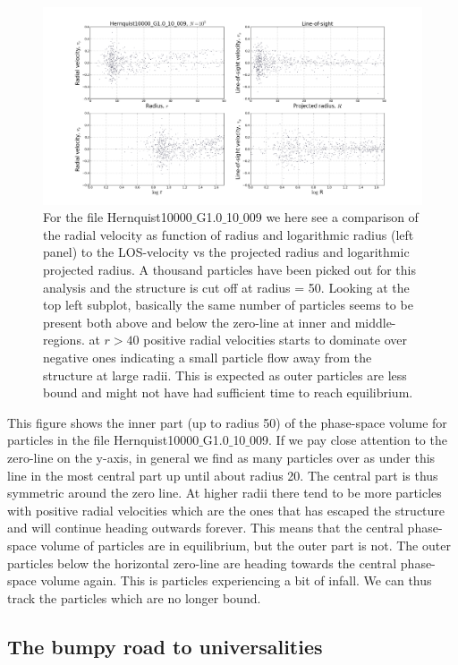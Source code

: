 \begin{figure}
\centering
\includegraphics[width=1.0\linewidth]{img/LOS_radius50_N1000.png}
\caption{For the file Hernquist10000$\_$G1.0$\_$10$\_$009 we here see a comparison of the radial velocity as function of radius and logarithmic radius (left panel) to the LOS-velocity vs the projected radius and logarithmic projected radius. A thousand particles have been picked out for this analysis and the structure is cut off at radius = 50.
Looking at the top left subplot, basically the same number of particles seems to be present both above and below the zero-line at inner and middle-regions. at $r>40$ positive radial velocities starts to dominate over negative ones indicating a small particle flow away from the structure at large radii. This is expected as outer particles are less bound and might not have had sufficient time to reach equilibrium.}
\label{fig:test}
\end{figure}

This figure shows the inner part (up to radius 50) of the phase-space volume for particles in the file Hernquist10000$\_$G1.0$\_$10$\_$009.
If we pay close attention to the zero-line on the y-axis, in general we find as many particles over as under this line in the most central part up until about radius 20.
The central part is thus symmetric around the zero line. At higher radii there tend to be more particles with positive radial velocities which are the ones that has escaped the structure and will continue heading outwards forever.
This means that the central phase-space volume of particles are in equilibrium, but the outer part is not. The outer particles below the horizontal zero-line are heading towards the central phase-space volume again. This is particles experiencing a bit of infall.  We can thus track the particles which are no longer bound.

\newpage
\subsection{The bumpy road to universalities}

